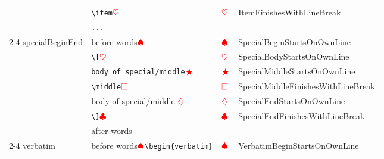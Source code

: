 \begin{longtable}{llll}
                                         & \verb!\item!$\color{red}\heartsuit$                                & $\color{red}\heartsuit$                  & ItemFinishesWithLineBreak                                         \\
                                         & \verb!...!                                                        &                                         &                                                                   \\
  \cmidrule{2-4}
  specialBeginEnd                        & before words$\color{red}\spadesuit$                               & $\color{red}\spadesuit$                 & SpecialBeginStartsOnOwnLine                                       \\
                                         & \verb!\[!$\color{red}\heartsuit$                                   & $\color{red}\heartsuit$                  & SpecialBodyStartsOnOwnLine                                        \\
                                         & \verb!body of special/middle!$\color{red}\bigstar$               & $\color{red}\bigstar$                  & SpecialMiddleStartsOnOwnLine                                      \\
                                         & \verb!\middle!$\color{red}\square$                        & $\color{red}\square$            & SpecialMiddleFinishesWithLineBreak                                \\
                                         & body of special/middle $\color{red}\diamondsuit$                      & $\color{red}\diamondsuit$                   & SpecialEndStartsOnOwnLine                                         \\
                                         & \verb!\]!$\color{red}\clubsuit$                              & $\color{red}\clubsuit$             & SpecialEndFinishesWithLineBreak                                   \\
                                         & after words                                                       &                                         &                                                                   \\
  \cmidrule{2-4}
  verbatim                               & before words$\color{red}\spadesuit$\verb!\begin{verbatim}!        & $\color{red}\spadesuit$                 & VerbatimBeginStartsOnOwnLine                                      \\

\end{longtable}
